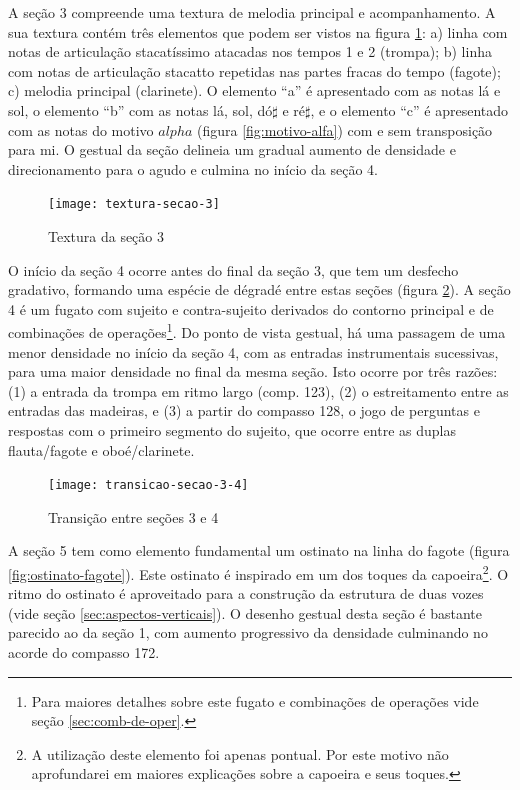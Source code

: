 A seção 3 compreende uma textura de melodia principal e
acompanhamento. A sua textura contém três elementos que podem ser
vistos na figura \ref{fig:textura-secao-3}: a) linha com notas de
articulação stacatíssimo atacadas nos tempos 1 e 2 (trompa); b) linha
com notas de articulação stacatto repetidas nas partes fracas do tempo
(fagote); c) melodia principal (clarinete). O elemento ``a'' é
apresentado com as notas lá e sol, o elemento ``b'' com as notas lá,
sol, dó$\sharp$ e ré$\sharp$, e o elemento ``c'' é apresentado com as
notas do motivo $alpha$ (figura \ref{fig:motivo-alfa}) com e sem
transposição para mi. O gestual da seção delineia um gradual aumento
de densidade e direcionamento para o agudo e culmina no início da
seção 4.

\begin{figure}
  \centering
  \texttt{[image: textura-secao-3]}
  \caption{Textura da seção 3}
  \label{fig:textura-secao-3}
\end{figure}

O início da seção 4 ocorre antes do final da seção 3, que tem um
desfecho gradativo, formando uma espécie de dégradé entre estas seções
(figura \ref{fig:transicao-secao-3-4}). A seção 4 é um fugato com
sujeito e contra-sujeito derivados do contorno principal e de
combinações de operações\footnote{Para maiores detalhes sobre este
  fugato e combinações de operações vide seção
  \ref{sec:comb-de-oper}.}. Do ponto de vista gestual, há uma passagem
de uma menor densidade no início da seção 4, com as entradas
instrumentais sucessivas, para uma maior densidade no final da mesma
seção. Isto ocorre por três razões: (1) a entrada da trompa em ritmo
largo (comp. 123), (2) o estreitamento entre as entradas das madeiras,
e (3) a partir do compasso 128, o jogo de perguntas e respostas com o
primeiro segmento do sujeito, que ocorre entre as duplas flauta/fagote
e oboé/clarinete.

\begin{figure}
  \centering
  \texttt{[image: transicao-secao-3-4]}
  \caption{Transição entre seções 3 e 4}
  \label{fig:transicao-secao-3-4}
\end{figure}

A seção 5 tem como elemento fundamental um ostinato na linha do fagote
(figura \ref{fig:ostinato-fagote}). Este ostinato é inspirado em um
dos toques da capoeira\footnote{A utilização deste elemento foi apenas
  pontual. Por este motivo não aprofundarei em maiores explicações
  sobre a capoeira e seus toques.}. O ritmo do ostinato é aproveitado
para a construção da estrutura de duas vozes (vide seção
\ref{sec:aspectos-verticais}). O desenho gestual desta seção é
bastante parecido ao da seção 1, com aumento progressivo da densidade
culminando no acorde do compasso 172.

